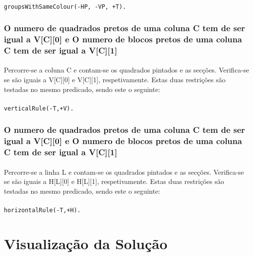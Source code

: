 \documentclass[runningheads,a4paper]{llncs}
\begin{document}
\paragraph{}
\begin{lstlisting}
groupsWithSameColour(-HP, -VP, +T).
\end{lstlisting}

\subsubsection{O numero de quadrados pretos de uma coluna C tem de ser igual a V[C][0] e O numero de blocos pretos de uma coluna C tem de ser igual a V[C][1]}
\paragraph{}
Percorre-se a coluna C e contam-se os quadrados pintados e as secções. Verifica-se se são iguais a V[C][0] e V[C][1], respetivamente.
Estas duas restrições são testadas no mesmo predicado, sendo este o seguinte:
\paragraph{}
\begin{lstlisting}
verticalRule(-T,+V).
\end{lstlisting}

\subsubsection{O numero de quadrados pretos de uma coluna C tem de ser igual a V[C][0] e O numero de blocos pretos de uma coluna C tem de ser igual a V[C][1]}
\paragraph{}
Percorre-se a linha L e contam-se os quadrados pintados e as secções. Verifica-se se são iguais a H[L][0] e H[L][1], respetivamente.
Estas duas restrições são testadas no mesmo predicado, sendo este o seguinte:
\paragraph{}
\begin{lstlisting}
horizontalRule(-T,+H).
\end{lstlisting}

\section{Visualização da Solução}
\end{document}

